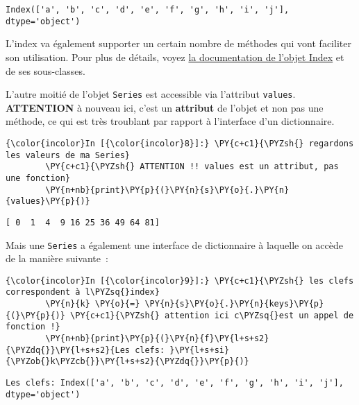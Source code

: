     \begin{Verbatim}[commandchars=\\\{\}]
Index(['a', 'b', 'c', 'd', 'e', 'f', 'g', 'h', 'i', 'j'], dtype='object')

    \end{Verbatim}

    L'index va également supporter un certain nombre de méthodes qui vont
faciliter son utilisation. Pour plus de détails, voyez
\href{http://pandas.pydata.org/pandas-docs/stable/generated/pandas.Index.html\#pandas.Index}{la
documentation de l'objet Index} et de ses sous-classes.

    L'autre moitié de l'objet \texttt{Series} est accessible via l'attribut
\texttt{values}. \textbf{ATTENTION} à nouveau ici, c'est un
\textbf{attribut} de l'objet et non pas une méthode, ce qui est très
troublant par rapport à l'interface d'un dictionnaire.

    \begin{Verbatim}[commandchars=\\\{\}]
{\color{incolor}In [{\color{incolor}8}]:} \PY{c+c1}{\PYZsh{} regardons les valeurs de ma Series}
        \PY{c+c1}{\PYZsh{} ATTENTION !! values est un attribut, pas une fonction}
        \PY{n+nb}{print}\PY{p}{(}\PY{n}{s}\PY{o}{.}\PY{n}{values}\PY{p}{)}
\end{Verbatim}


    \begin{Verbatim}[commandchars=\\\{\}]
[ 0  1  4  9 16 25 36 49 64 81]

    \end{Verbatim}

    Mais une \texttt{Series} a également une interface de dictionnaire à
laquelle on accède de la manière suivante~:

    \begin{Verbatim}[commandchars=\\\{\}]
{\color{incolor}In [{\color{incolor}9}]:} \PY{c+c1}{\PYZsh{} les clefs correspondent à l\PYZsq{}index}
        \PY{n}{k} \PY{o}{=} \PY{n}{s}\PY{o}{.}\PY{n}{keys}\PY{p}{(}\PY{p}{)} \PY{c+c1}{\PYZsh{} attention ici c\PYZsq{}est un appel de fonction !}
        \PY{n+nb}{print}\PY{p}{(}\PY{n}{f}\PY{l+s+s2}{\PYZdq{}}\PY{l+s+s2}{Les clefs: }\PY{l+s+si}{\PYZob{}k\PYZcb{}}\PY{l+s+s2}{\PYZdq{}}\PY{p}{)}
\end{Verbatim}


    \begin{Verbatim}[commandchars=\\\{\}]
Les clefs: Index(['a', 'b', 'c', 'd', 'e', 'f', 'g', 'h', 'i', 'j'], dtype='object')

    \end{Verbatim}

